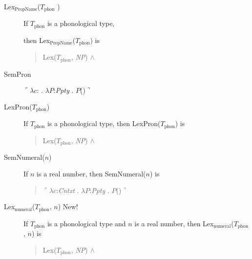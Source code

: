 \begin{description}
\item[\textnormal{Lex$_{\mathrm{PropName}}$($T_{\mathrm{phon}}$
    )}] \mbox{}

  If $T_{\mathrm{phon}}$ is a phonological type,

  then Lex$_{\mathrm{PropName}}$($T_{\mathrm{phon}}$) is
  \begin{quote}
    Lex($T_{\mathrm{phon}}$, \textit{NP}) \d{$\wedge$}
\end{quote}

\item[\textnormal{SemPron} ] \mbox{}

  $\ulcorner\lambda c$: . $\lambda
  P$:\textit{Ppty}
  . $P$()$\urcorner$

\item[\textnormal{LexPron($T_{\text{phon}}$)}] \mbox{}

If $T_{\text{phon}}$ is a phonological type, then
LexPron($T_{\text{phon}}$) is
\begin{quote}
Lex($T_{\mathrm{phon}}$, \textit{NP}) \d{$\wedge$}
\end{quote}

\item[\textnormal{SemNumeral($n$)}] \mbox{}

  If $n$ is a real number, then SemNumeral($n$) is
  \begin{quote}
    $\ulcorner\lambda c$:\textit{Cntxt} . $\lambda P$:\textit{Ppty}
    . $P$()$\urcorner$
  \end{quote}

  
\item[\textnormal{Lex$_{\mathrm{numeral}}$($T_{\mathrm{phon}}$, $n$)}
    New!] \mbox{}

    If $T_{\mathrm{phon}}$ is a phonological type and $n$ is a real
    number, then Lex$_{\mathrm{numeral}}$($T_{\mathrm{phon}}$, $n$) is
    \begin{quote}
      Lex($T_{\mathrm{phon}}$, \textit{NP}) \d{$\wedge$}
    \end{quote}
    


\end{description}
